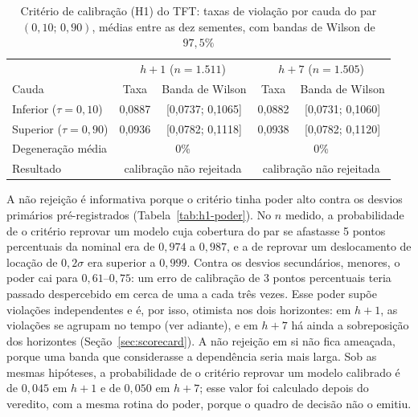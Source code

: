 \begin{table}[htb]
\centering
\caption[Critério de calibração (H1) do TFT]{Critério de calibração (H1) do TFT: taxas de violação por cauda do par \((0{,}10;\,0{,}90)\), médias entre as dez sementes, com bandas de Wilson de \(97{,}5\%\)}
\label{tab:h1}
\small
\begin{tabular}{l c c c c}
\toprule
 & \multicolumn{2}{c}{\(h+1\) (\(n = 1.511\))} & \multicolumn{2}{c}{\(h+7\) (\(n = 1.505\))} \\
Cauda & Taxa & Banda de Wilson & Taxa & Banda de Wilson \\
\midrule
Inferior (\(\tau = 0{,}10\)) & 0,0887 & [0,0737; 0,1065] & 0,0882 & [0,0731; 0,1060] \\
Superior (\(\tau = 0{,}90\)) & 0,0936 & [0,0782; 0,1118] & 0,0938 & [0,0782; 0,1120] \\
\midrule
Degeneração média & \multicolumn{2}{c}{0\%} & \multicolumn{2}{c}{0\%} \\
Resultado & \multicolumn{2}{c}{calibração não rejeitada} & \multicolumn{2}{c}{calibração não rejeitada} \\
\bottomrule
\end{tabular}
\end{table}

A não rejeição é informativa porque o critério tinha poder alto contra os desvios primários pré-registrados (Tabela~\ref{tab:h1-poder}). No \(n\) medido, a probabilidade de o critério reprovar um modelo cuja cobertura do par se afastasse 5 pontos percentuais da nominal era de \(0{,}974\) a \(0{,}987\), e a de reprovar um deslocamento de locação de \(0{,}2\sigma\) era superior a \(0{,}999\). Contra os desvios secundários, menores, o poder cai para \(0{,}61\)--\(0{,}75\): um erro de calibração de 3 pontos percentuais teria passado despercebido em cerca de uma a cada três vezes. Esse poder supõe violações independentes e é, por isso, otimista nos dois horizontes: em \(h+1\), as violações se agrupam no tempo (ver adiante), e em \(h+7\) há ainda a sobreposição dos horizontes (Seção~\ref{sec:scorecard}). A não rejeição em si não fica ameaçada, porque uma banda que considerasse a dependência seria mais larga. Sob as mesmas hipóteses, a probabilidade de o critério reprovar um modelo calibrado é de \(0{,}045\) em \(h+1\) e de \(0{,}050\) em \(h+7\); esse valor foi calculado depois do veredito, com a mesma rotina do poder, porque o quadro de decisão não o emitiu.

